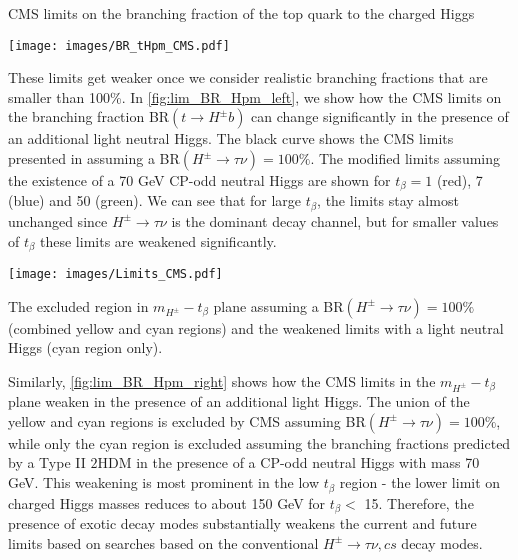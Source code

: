 \begin{marginfigure}
    \caption{CMS limits on the branching fraction of the top quark to the charged Higgs}
 	\texttt{[image: images/BR\_tHpm\_CMS.pdf]}
\label{fig:lim_BR_Hpm_left}
\end{marginfigure}

These limits get weaker once we consider realistic branching fractions that are smaller than 100\%. In \autoref{fig:lim_BR_Hpm_left}, we show how the CMS limits on the branching fraction BR$(t \rightarrow H^{\pm} b)$ can change significantly in the presence of an additional light neutral Higgs. The black curve shows the CMS limits presented in \cite{CMS:2014cdp} assuming a BR$(H^{\pm} \rightarrow \tau \nu) = 100\%$. The modified limits assuming the existence of a 70 GeV CP-odd neutral Higgs are shown for $t_{\beta}=1$ (red), 7 (blue) and 50 (green). We can see that for large $t_{\beta}$, the limits stay almost unchanged since $H^{\pm} \rightarrow \tau \nu$ is the dominant decay channel, but for smaller values of $t_{\beta}$ these limits are weakened significantly.

\begin{marginfigure}[2in]
 	\texttt{[image: images/Limits\_CMS.pdf]}
    \caption{The excluded region in $m_{H^\pm}-t_{\beta}$ plane assuming a BR$(H^{\pm} \rightarrow \tau \nu) = 100\%$ (combined yellow and cyan regions) and the weakened limits with a light neutral Higgs (cyan region only).}
\label{fig:lim_BR_Hpm_right}
\end{marginfigure}

Similarly, \autoref{fig:lim_BR_Hpm_right} shows how the CMS limits in the $m_{H^{\pm}}-t_{\beta}$ plane weaken in the presence of an additional light Higgs. The union of the yellow and cyan regions is excluded by CMS assuming BR$(H^{\pm} \rightarrow \tau \nu) = 100\%$, while only the cyan region is excluded assuming the branching fractions predicted by a Type II $2$HDM in the presence of a CP-odd neutral Higgs with mass 70 GeV. This weakening is most prominent in the low $t_\beta$ region - the lower limit on charged Higgs masses reduces to about 150 GeV for $t_{\beta}<$ 15. Therefore, the presence of exotic decay modes substantially weakens the current and future limits based on searches based on the conventional $H^{\pm} \rightarrow \tau \nu, cs$ decay modes. 

